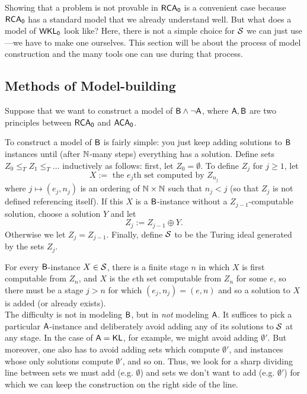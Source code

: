 \documentclass{amsart}
\begin{document}
	Showing that a problem is not provable in $\RCA$ is a convenient case because $\RCA$ has a standard model that we already understand well. But what does a model of $\WKL$ look like? Here, there is not a simple choice for $\SS$ we can just use---we have to make one ourselves. This section will be about the process of model construction and the many tools one can use during that process.
	
	
	\subsection{Methods of Model-building}
	
	Suppose that we want to construct a model of $\sf{B}\^\neg \sf{A}$, where $\sf{A},\sf{B}$ are two principles between $\RCA$ and $\ACA$. 
	
	
	To construct a model of $\sf{B}$ is fairly simple: you just keep adding solutions to $\sf{B}$ instances until (after $\N$-many steps) everything has a solution. Define sets $Z_0\leq_T Z_1 \leq_T \dots$ inductively as follows: first, let $Z_0=\emptyset$. To define $Z_j$ for $j\geq 1$, let 
	$$X := \text{ the $e_j$th set computed by $Z_{n_j}$}$$
	where $j\mapsto (e_j,n_j)$ is an ordering of $\N\times \N$ such that $n_j<j$ (so that $Z_j$ is not defined referencing itself). If this $X$ is a $\sf{B}$-instance without a $Z_{j-1}$-computable solution, choose a solution $Y$ and let
	$$
	Z_j := Z_{j-1} \oplus Y.
	$$
	Otherwise we let $Z_j=Z_{j-1}$. Finally, define $\SS$ to be the Turing ideal generated by the sets $Z_j$.
	
	For every $\sf{B}$-instance $X\in \SS$, there is a finite stage $n$ in which $X$ is first computable from $Z_n$, and $X$ is the $e$th set computable from $Z_n$ for some $e$, so there must be a stage $j>n$ for which $(e_j,n_j)=(e,n)$ and so a solution to $X$ is added (or already exists). \\
	
	The difficulty is not in modeling $\sf{B}$, but in \textit{not} modeling $\sf{A}$. It suffices to pick a particular $\sf{A}$-instance and deliberately avoid adding any of its solutions to $\SS$ at any stage. In the case of $\sf{A}=\KL$, for example, we might avoid adding $\emptyset'$. But moreover, one also has to avoid adding sets which compute $\emptyset'$, and instances whose only solutions compute $\emptyset'$, and so on. Thus, we look for a sharp dividing line between sets we must add (e.g. $\emptyset$) and sets we don't want to add (e.g. $\emptyset'$) for which we can keep the construction on the right side of the line.\\
	
\end{document}
